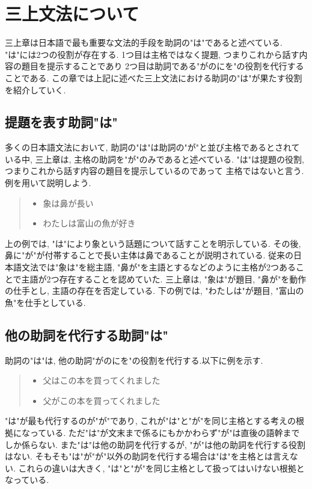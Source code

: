 \documentclass{jreport}
\begin{document}
\chapter{三上文法について}
三上章は日本語で最も重要な文法的手段を助詞の"は"であると述べている.
"は"には2つの役割が存在する. 1つ目は主格ではなく提題, つまりこれから話す内容の題目を提示することであり
2つ目は助詞である"がのにを"の役割を代行することである.
この章では上記に述べた三上文法における助詞の"は"が果たす役割を紹介していく.

\section{提題を表す助詞"は"}
多くの日本語文法において, 助詞の"は"は助詞の"が"と並び主格であるとされている中, 
三上章は, 主格の助詞を"が"のみであると述べている. "は"は提題の役割, つまりこれから話す内容の題目を提示しているのであって
主格ではないと言う. 例を用いて説明しよう.
\begin{quote}
 \begin{itemize}
  \item 象は鼻が長い
  \item わたしは富山の魚が好き
 \end{itemize}
\end{quote}
上の例では, "は"により象という話題について話すことを明示している. 
その後, 鼻に"が"が付帯することで長い主体は鼻であることが説明されている.
従来の日本語文法では"象は"を総主語, "鼻が"を主語とするなどのように主格が2つあることで主語が2つ存在することを認めていた.
三上章は, "象は"が題目, "鼻が"を動作の仕手とし, 主語の存在を否定している. 
下の例では, "わたしは"が題目, "富山の魚"を仕手としている.


\section{他の助詞を代行する助詞"は"}
助詞の"は"は, 他の助詞"がのにを"の役割を代行する.以下に例を示す.
\begin{quote}
 \begin{itemize}
  \item 父はこの本を買ってくれました
  \item 父がこの本を買ってくれました
 \end{itemize}
\end{quote}
   
"は"が最も代行するのが"が"であり, これが"は"と"が"を同じ主格とする考えの根拠になっている.
ただ"は"が文末まで係るにもかかわらず"が"は直後の語幹までしか係らない.
また"は"は他の助詞を代行するが, "が"は他の助詞を代行する役割はない.
そもそも"は"が"が"以外の助詞を代行する場合は"は"を主格とは言えない.
これらの違いは大きく, "は"と"が"を同じ主格として扱ってはいけない根拠となっている.
\end{document}
